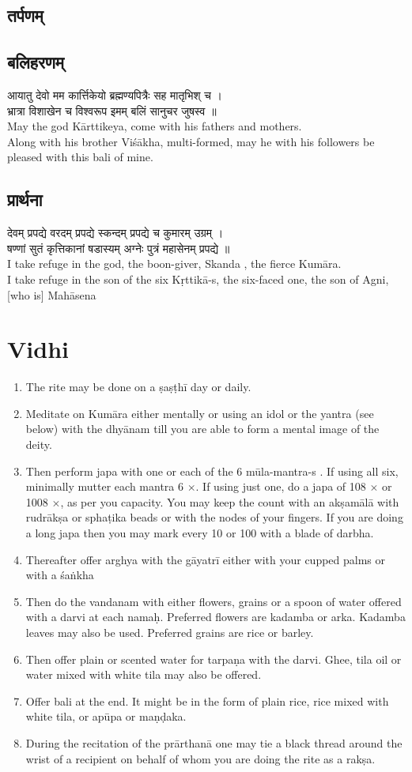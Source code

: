 \documentclass[13pt]{article}
\begin{document}
\subsection{{\skt तर्पणम् }}
\subsection{{\skt बलिहरणम् }}
{\skt आयातु देवो मम कार्त्तिकेयो ब्रह्मण्यपित्रैः सह मातृभिश् च ।\\
भ्रात्रा विशाखेन च विश्वरूप इमम् बलिं सानुचर जुषस्व ॥ 
}\\[8pt]
May the god Kārttikeya, come with his fathers and mothers.\\
Along with his brother Viśākha, multi-formed, may he with his followers be pleased with this bali of mine.
\subsection{{\skt प्रार्थना }}
{\skt  देवम् प्रपद्ये वरदम् प्रपद्ये स्कन्दम् प्रपद्ये च कुमारम् उग्रम् ।\\
षण्णां सुतं कृत्तिकानां षडास्यम् अग्नेः पुत्रं महासेनम् प्रपद्ये ॥
}\\[8pt]
I take refuge in the god, the boon-giver, Skanda , the fierce Kumāra.\\
I take refuge in the son of the six Kṛttikā-s, the six-faced one, the son of Agni, [who is] Mahāsena
\section{Vidhi}
\begin{enumerate}
\item The rite may be done on a ṣaṣṭhī day or daily.
\item Meditate on Kumāra either mentally or using an idol or the yantra (see below) with the dhyānam till you are able to form a mental image of the deity.
\item  Then perform japa with one or each of the 6 mūla-mantra-s . If using all six, minimally mutter each mantra 6 $\times$. If using just one, do a japa of 108 $\times$ or 1008 $\times$, as per you capacity. You may keep the count with an akṣamālā with rudrākṣa or sphaṭika beads or with the nodes of your fingers. If you are doing a long japa then you may mark every 10 or 100 with a blade of darbha.
\item  Thereafter offer arghya with the gāyatrī either with your cupped palms or with a śaṅkha
\item Then do the vandanam with either flowers, grains or a spoon of water offered with a darvi at each namaḥ. Preferred flowers are kadamba or arka. Kadamba leaves may also be used. Preferred grains are rice or barley.
\item Then offer plain or scented water for tarpaṇa with the darvi. Ghee, tila oil or water mixed with white tila may also be offered.
\item Offer bali at the end. It might be in the form of plain rice, rice mixed with white tila, or  apūpa or maṇḍaka.
\item During the recitation of the prārthanā one may tie a black thread around the wrist of a recipient on behalf of whom you are doing the rite as a rakṣa.
\end{enumerate} 
\end{document}
